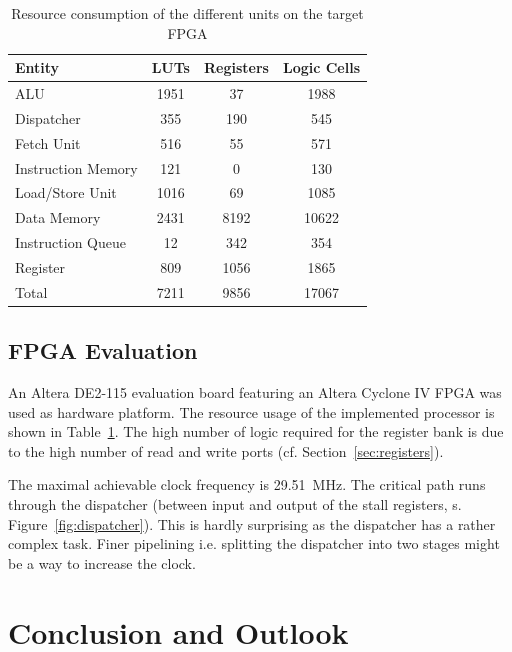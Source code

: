 \documentclass[conference]{IEEEtran}
\begin{document}
\begin{table}
	\caption{Resource consumption of the different units on the target FPGA}
	\centering
	\begin{tabular}{l c c c}
			Entity & LUTs & Registers & Logic Cells \\
		\midrule
			ALU & 1951 & 37 & 1988 \\
			Dispatcher & 355 & 190 & 545 \\
			Fetch Unit & 516 & 55 & 571 \\
			Instruction Memory & 121 & 0 & 130 \\
			Load/Store Unit & 1016 & 69 & 1085 \\
			Data Memory & 2431 & 8192 & 10622 \\
			Instruction Queue & 12 & 342 & 354 \\
			Register & 809 & 1056 & 1865 \\
		\midrule
			Total & 7211 & 9856 & 17067 \\
	\end{tabular}
	\label{tab:resources}
\end{table}

\subsection{FPGA Evaluation}

An Altera DE2-115 evaluation board featuring an Altera Cyclone IV FPGA was used as hardware platform. The resource usage of the implemented processor is shown in Table~\ref{tab:resources}. 
The high number of logic required for the register bank is due to the high number of read and write ports (cf. Section~\ref{sec:registers}).

The maximal achievable clock frequency is \SI{29.51}{\MHz}. The critical path runs through the dispatcher (between input and output of the stall registers, s. Figure~\ref{fig:dispatcher}). This is hardly surprising as the dispatcher has a rather complex task. Finer pipelining i.e. splitting the dispatcher into two stages might be a way to increase the clock.

\section{Conclusion and Outlook} \label{sec:conclusion}



\cite{HP}


\printbibliography
\end{document}
